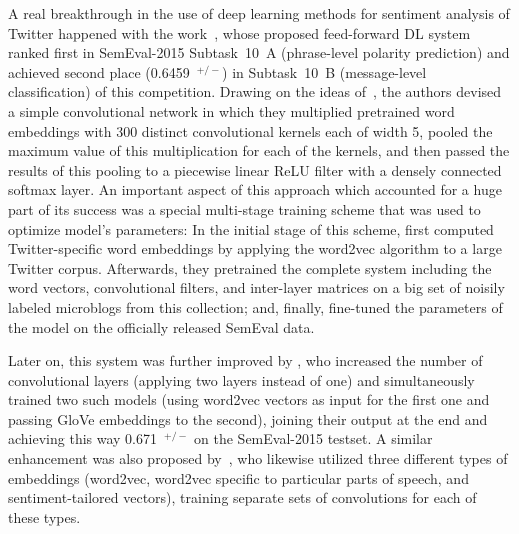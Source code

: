 A real breakthrough in the use of deep learning methods for sentiment
analysis of Twitter happened with the work~\citet{Severyn:15}, whose
proposed feed-forward DL system ranked first in SemEval-2015
Subtask~10~A (phrase-level polarity prediction) \cite{Rosenthal:15}
and achieved second place (0.6459~\F$^{+/-}$) in Subtask~10~B
(message-level classification) of this competition.  Drawing on the
ideas of~\citet{Kalchbrenner:14}, the authors devised a simple
convolutional network in which they multiplied pretrained word
embeddings with 300 distinct convolutional kernels each of width 5,
pooled the maximum value of this multiplication for each of the
kernels, and then passed the results of this pooling to a piecewise
linear ReLU filter with a densely connected softmax layer.  An
important aspect of this approach which accounted for a huge part of
its success was a special multi-stage training scheme that was used to
optimize model's parameters: In the initial stage of this scheme,
\citeauthor{Severyn:15} first computed Twitter-specific word
embeddings by applying the word2vec algorithm to a large Twitter
corpus.  Afterwards, they pretrained the complete system including the
word vectors, convolutional filters, and inter-layer matrices on a big
set of noisily labeled microblogs from this collection; and, finally,
fine-tuned the parameters of the model on the officially released
SemEval data.

Later on, this system was further improved by \citet{Deriu:16}, who
increased the number of convolutional layers (applying two layers
instead of one) and simultaneously trained two such models (using
word2vec vectors as input for the first one and passing GloVe
embeddings to the second), joining their output at the end and
achieving this way 0.671~\F$^{+/-}$ on the SemEval-2015 testset.  A
similar enhancement was also proposed by~\citet{Rouvier:16}, who
likewise utilized three different types of embeddings (word2vec,
word2vec specific to particular parts of speech, and
sentiment-tailored vectors), training separate sets of convolutions
for each of these types.



